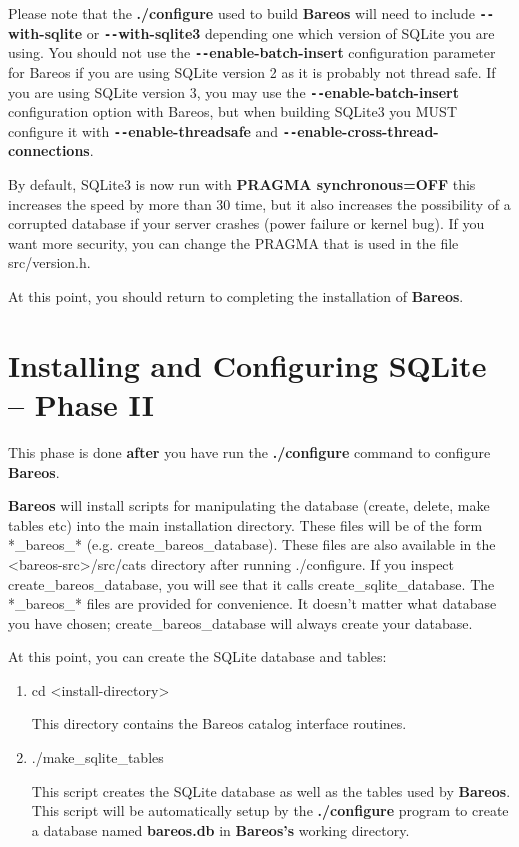 Please note that the {\bf ./configure} used to build {\bf Bareos} will need to
include {\bf \verb:--:with-sqlite} or {\bf \verb:--:with-sqlite3} depending
one which version of SQLite you are using. You should not use the {\bf
\verb:--:enable-batch-insert} configuration parameter for Bareos if you
are using SQLite version 2 as it is probably not thread safe.  If you
are using SQLite version 3, you may use the {\bf \verb:--:enable-batch-insert}
configuration option with Bareos, but when building SQLite3 you MUST
configure it with {\bf \verb:--:enable-threadsafe} and
{\bf \verb:--:enable-cross-thread-connections}.

By default, SQLite3 is now run with {\bf PRAGMA synchronous=OFF} this
increases the speed by more than 30 time, but it also increases the
possibility of a corrupted database if your server crashes (power failure
or kernel bug).  If you want more security, you can change the PRAGMA
that is used in the file src/version.h.


At this point, you should return to completing the installation of {\bf
Bareos}.


\section{Installing and Configuring SQLite -- Phase II}
\label{phase2}

This phase is done {\bf after} you have run the {\bf ./configure} command to
configure {\bf Bareos}.

{\bf Bareos} will install scripts for manipulating the database (create,
delete, make tables etc) into the main installation directory. These files
will be of the form *\_bareos\_* (e.g. create\_bareos\_database). These files
are also available in the {\textless}bareos-src{\textgreater}/src/cats directory after
running ./configure. If you inspect create\_bareos\_database, you will see
that it calls create\_sqlite\_database. The *\_bareos\_* files are provided
for convenience. It doesn't matter what database you have chosen;
create\_bareos\_database will always create your database.

At this point, you can create the SQLite database and tables:

\begin{enumerate}
\item cd {\textless}install-directory{\textgreater}

   This directory contains the Bareos catalog  interface routines.

\item ./make\_sqlite\_tables

   This script creates the SQLite database as well as the  tables used by {\bf
   Bareos}. This script will be  automatically setup by the {\bf ./configure}
   program  to create a database named {\bf bareos.db} in {\bf Bareos's}  working
   directory.
\end{enumerate}

